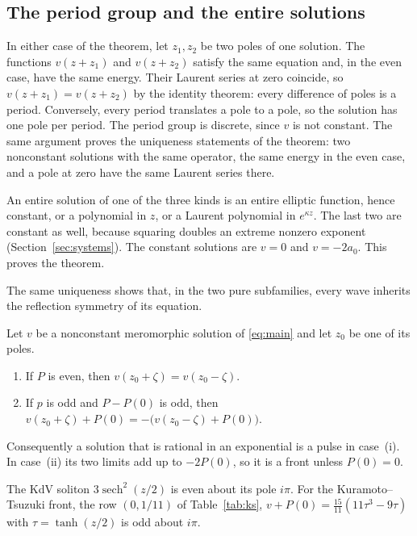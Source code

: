 \subsection{The period group and the entire solutions}

In either case of the theorem, let \(z_1,z_2\) be two poles of one
solution. The functions \(v(z+z_1)\) and \(v(z+z_2)\) satisfy the same
equation and, in the even case, have the same energy. Their Laurent
series at zero coincide, so \(v(z+z_1)=v(z+z_2)\) by the identity
theorem: every difference of poles is a period. Conversely, every period
translates a pole to a pole, so the solution has one pole per period.
The period group is discrete, since \(v\) is not constant. The same
argument proves the uniqueness statements of the theorem: two
nonconstant solutions with the same operator, the same energy in the
even case, and a pole at zero have the same Laurent series there.

An entire solution of one of the three kinds is an entire elliptic
function, hence constant, or a polynomial in \(z\), or a Laurent
polynomial in \(e^{\kappa z}\). The last two are constant as well,
because squaring doubles an extreme nonzero exponent
(Section~\ref{sec:systems}). The constant solutions are \(v=0\) and
\(v=-2a_0\). This proves the theorem.

The same uniqueness shows that, in the two pure subfamilies, every wave
inherits the reflection symmetry of its equation.

\begin{corollary}
\label{cor:symmetric-waves}
Let \(v\) be a nonconstant meromorphic solution of \eqref{eq:main} and
let \(z_0\) be one of its poles.
\begin{enumerate}
\item[\textup{(i)}] If \(P\) is even, then
\(v(z_0+\zeta)=v(z_0-\zeta)\).
\item[\textup{(ii)}] If \(p\) is odd and \(P-P(0)\) is odd, then
\(v(z_0+\zeta)+P(0)=-\bigl(v(z_0-\zeta)+P(0)\bigr)\).
\end{enumerate}
Consequently a solution that is rational in an exponential is a pulse in
case~\textup{(i)}. In case~\textup{(ii)} its two limits add up to
\(-2P(0)\), so it is a front unless \(P(0)=0\).
\end{corollary}

The KdV soliton \(3\operatorname{sech}^2(z/2)\) is even about its pole
\(i\pi\). For the Kuramoto--Tsuzuki front, the row \((0,1/11)\) of
Table~\ref{tab:ks}, \(v+P(0)=\tfrac{15}{11}(11\tau^3-9\tau)\) with
\(\tau=\tanh(z/2)\) is odd about \(i\pi\).

